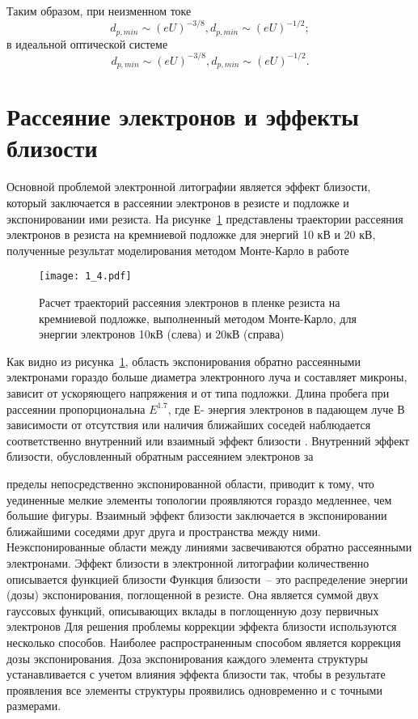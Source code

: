 Таким образом, при неизменном токе
\begin{equation}
d_{p,min}\sim (eU)^{-3/8},d_{p,min}\sim(eU)^{-1/2};
\label{eq:A7}
\end{equation}
в идеальной оптической системе
\begin{equation}
d_{p,min}\sim (eU)^{-3/8},d_{p,min}\sim(eU)^{-1/2}.
\end{equation}

\section{Рассеяние электронов и эффекты близости}

Основной проблемой электронной литографии является эффект близости, который заключается в рассеянии электронов в резисте и подложке и экспонировании ими резиста. На рисунке~\ref{fig:4} представлены траектории рассеяния электронов в резиста на кремниевой подложке для энергий 10 кВ и 20 кВ, полученные результат моделирования методом Монте-Карло в работе \cite{4}

\begin{figure}[H]
\center
\texttt{[image: 1\_4.pdf]}
\caption{ Расчет траекторий рассеяния электронов в пленке резиста на кремниевой подложке, выполненный методом Монте-Карло, для энергии электронов 10кВ (слева) и 20кВ (справа)}
\label{fig:4}
\end{figure}

Как видно из рисунка~\ref{fig:4}, область экспонирования обратно рассеянными электронами гораздо больше диаметра электронного луча и составляет микроны, зависит от ускоряющего напряжения и от типа подложки. Длина пробега при рассеянии пропорциональна $E^{1.7}$, где Е- энергия электронов в падающем луче
В зависимости от отсутствия или наличия ближайших соседей наблюдается соответственно внутренний или взаимный эффект близости . Внутренний эффект близости, обусловленный обратным рассеянием электронов за

пределы непосредственно экспонированной области, приводит к тому, что уединенные мелкие элементы топологии проявляются гораздо медленнее, чем большие фигуры. Взаимный эффект близости заключается в экспонировании ближайшими соседями друг друга и пространства между ними. Неэкспонированные области между линиями засвечиваются обратно рассеянными электронами.
Эффект близости в электронной литографии количественно описывается функцией близости
Функция близости~-- это распределение энергии (дозы) экспонирования, поглощенной в резисте. Она является суммой двух гауссовых функций, описывающих вклады в поглощенную дозу первичных электронов
Для решения проблемы коррекции эффекта близости используются несколько способов. Наиболее распространенным способом является коррекция дозы экспонирования. Доза экспонирования каждого элемента структуры устанавливается с учетом влияния эффекта близости так, чтобы в результате проявления все элементы структуры проявились одновременно и с точными размерами.

